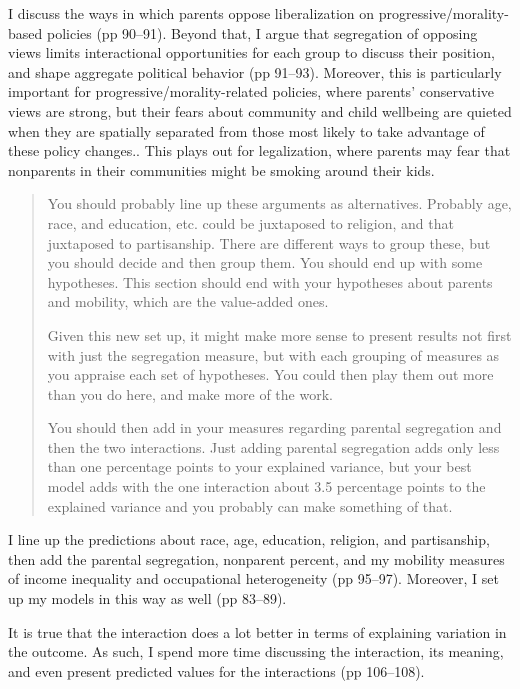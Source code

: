 \documentclass[12pt,stdletter,dateno,sigleft]{newlfm} %
\begin{document}
\begin{newlfm}
I discuss the ways in which parents oppose liberalization on progressive/morality-based policies (pp 90--91). Beyond that, I argue that segregation of opposing views limits interactional opportunities for each group to discuss their position, and shape aggregate political behavior (pp 91--93). Moreover, this is particularly important for  progressive/morality-related policies, where parents' conservative views are strong, but their fears about community and child wellbeing are quieted when they are spatially separated from those most likely to take advantage of these policy changes.. This plays out for legalization, where parents may fear that nonparents in their communities might be smoking around their kids. 


\begin{quotation}{\color{red}\noindent \footnotesize
You should probably line up these arguments as alternatives.  Probably age, race, and education, etc. could be juxtaposed to religion, and that juxtaposed to partisanship.  There are different ways to group these, but you should decide and then group them.  You should end up with some hypotheses. This section should end with your hypotheses about parents and mobility, which are the value-added ones. \newline

\noindent Given this new set up, it might make more sense to present results not first with just the segregation measure, but with each grouping of measures as you appraise each set of hypotheses.  You could then play them out more than you do here, and make more of the work. \newline

\noindent You should then add in your measures regarding parental segregation and then the two interactions.   Just adding parental segregation adds only less than one percentage points to your explained variance, but your best model adds with the one interaction about 3.5 percentage points to the explained variance and you probably can make something of that.
}
\end{quotation}

 
I line up the predictions about race, age, education, religion, and partisanship, then add the parental segregation, nonparent percent, and my mobility measures of income inequality and occupational heterogeneity (pp 95--97). Moreover, I set up my models in this way as well (pp 83--89). 

It is true that the interaction does a lot better in terms of explaining variation in the outcome. As such, I spend more time discussing the interaction, its meaning, and even present predicted values for the interactions (pp 106--108).



\end{newlfm}
\end{document}
